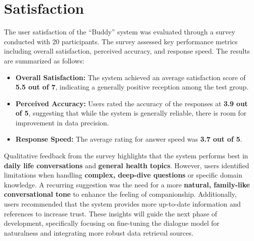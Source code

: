 \section{Satisfaction}
\noindent\hspace{2.2em}The user satisfaction of the “Buddy” system was evaluated through a survey conducted with 20 participants. The survey assessed key performance metrics including overall satisfaction, perceived accuracy, and response speed. The results are summarized as follows:

\begin{itemize}
    \item \textbf{Overall Satisfaction:} The system achieved an average satisfaction score of \textbf{5.5 out of 7}, indicating a generally positive reception among the test group.
    \item \textbf{Perceived Accuracy:} Users rated the accuracy of the responses at \textbf{3.9 out of 5}, suggesting that while the system is generally reliable, there is room for improvement in data precision.
    \item \textbf{Response Speed:} The average rating for answer speed was \textbf{3.7 out of 5}.
\end{itemize}

\noindent\hspace{2.2em}Qualitative feedback from the survey highlights that the system performs best in \textbf{daily life conversations} and \textbf{general health topics}. However, users identified limitations when handling \textbf{complex, deep-dive questions} or specific domain knowledge. A recurring suggestion was the need for a more \textbf{natural, family-like conversational tone} to enhance the feeling of companionship. Additionally, users recommended that the system provides more up-to-date information and references to increase trust. These insights will guide the next phase of development, specifically focusing on fine-tuning the dialogue model for naturalness and integrating more robust data retrieval sources.
